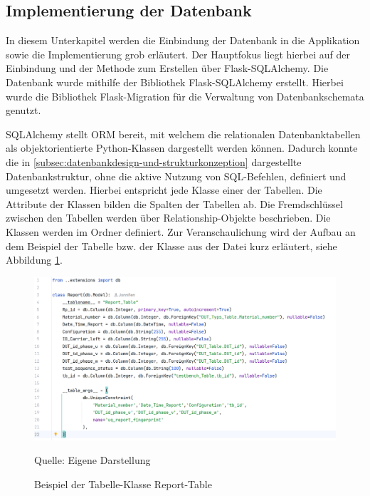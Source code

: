 \subsection{Implementierung der Datenbank}
\label{subsec:implementierung-der-datenbank}

In diesem Unterkapitel werden die Einbindung der Datenbank in die Applikation sowie die Implementierung grob erläutert.
Der Hauptfokus liegt hierbei auf der Einbindung und der Methode zum Erstellen über Flask-SQLAlchemy.
Die Datenbank wurde mithilfe der Bibliothek Flask-SQLAlchemy erstellt.
Hierbei wurde die Bibliothek Flask-Migration für die Verwaltung von Datenbankschemata genutzt.

SQLAlchemy stellt \ac{ORM} bereit, mit welchem die relationalen Datenbanktabellen als objektorientierte Python-Klassen dargestellt werden können.
Dadurch konnte die in \ref{subsec:datenbankdesign-und-strukturkonzeption} dargestellte Datenbankstruktur, ohne die aktive Nutzung von SQL-Befehlen, definiert und umgesetzt werden.
Hierbei entspricht jede Klasse einer der Tabellen.
Die Attribute der Klassen bilden die Spalten der Tabellen ab. Die Fremdschlüssel zwischen den Tabellen werden über Relationship-Objekte beschrieben.
Die Klassen werden im Ordner  definiert.
Zur Veranschaulichung wird der Aufbau an dem Beispiel der Tabelle bzw. der Klasse  aus der Datei  kurz erläutert, siehe Abbildung \ref{fig: Beispiel der Tabelle-Klasse Report-Table}.

\begin{figure}[H]
    \centering
    \includegraphics[width=1\textwidth]{Grafiken/5.4 Class.png}
    \caption{Beispiel der Tabelle-Klasse Report-Table}
    \label{fig: Beispiel der Tabelle-Klasse Report-Table}
    {Quelle: Eigene Darstellung}
\end{figure}



